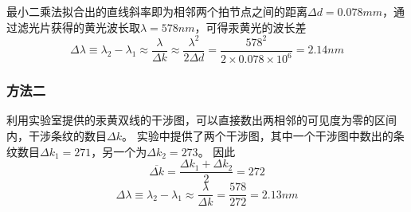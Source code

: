 \documentclass{article}
\begin{document}
    最小二乘法拟合出的直线斜率即为相邻两个拍节点之间的距离$\Delta d=0.078mm$，通过滤光片获得的黄光波长取$\lambda=578nm$，可得汞黄光的波长差
    $$\Delta \lambda \equiv \lambda_{2}-\lambda_{1} \approx \frac{\lambda}{\Delta k} \approx \frac{\lambda^{2}}{2 \Delta d}=\frac{578^2}{2\times 0.078\times 10^6}=2.14nm$$

    \subsubsection{方法二}
    利用实验室提供的汞黄双线的干涉图，可以直接数出两相邻的可见度为零的区间内，干涉条纹的数目$\Delta k$。
    实验中提供了两个干涉图，其中一个干涉图中数出的条纹数目$\Delta k_1=271$，另一个为$\Delta k_2=273$。
    因此
    $$\overline{\Delta k}=\frac{\Delta k_1+\Delta k_2}{2}=272$$
    $$\Delta \lambda \equiv \lambda_{2}-\lambda_{1} \approx \frac{\lambda}{\Delta k}=\frac{578}{272}=2.13nm$$
\end{document}
